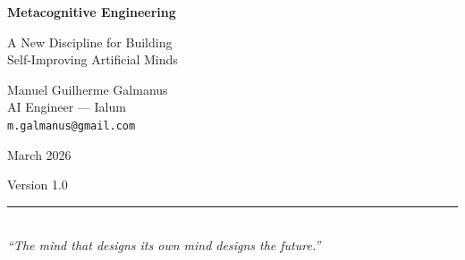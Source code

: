 \documentclass[12pt,a4paper]{article}
\theoremstyle{plain}
\theoremstyle{definition}
\theoremstyle{remark}
\begin{document}
\begin{titlepage}
\begin{center}

\vspace*{3cm}

{\Huge \textbf{Metacognitive Engineering}}

\vspace{1em}

{\LARGE A New Discipline for Building\\[0.3em]
Self-Improving Artificial Minds}

\vspace{3cm}

{\Large Manuel Guilherme Galmanus}\\[0.5em]
{\normalsize AI Engineer --- Ialum}\\[0.3em]
{\small \texttt{m.galmanus@gmail.com}}

\vspace{2cm}

{\large March 2026}

\vspace{1em}

{\small Version 1.0}

\vspace{3cm}

\rule{0.5\textwidth}{0.4pt}\\[1.5em]

\textit{``The mind that designs its own mind designs the future.''}

\end{center}
\end{titlepage}
\end{document}
